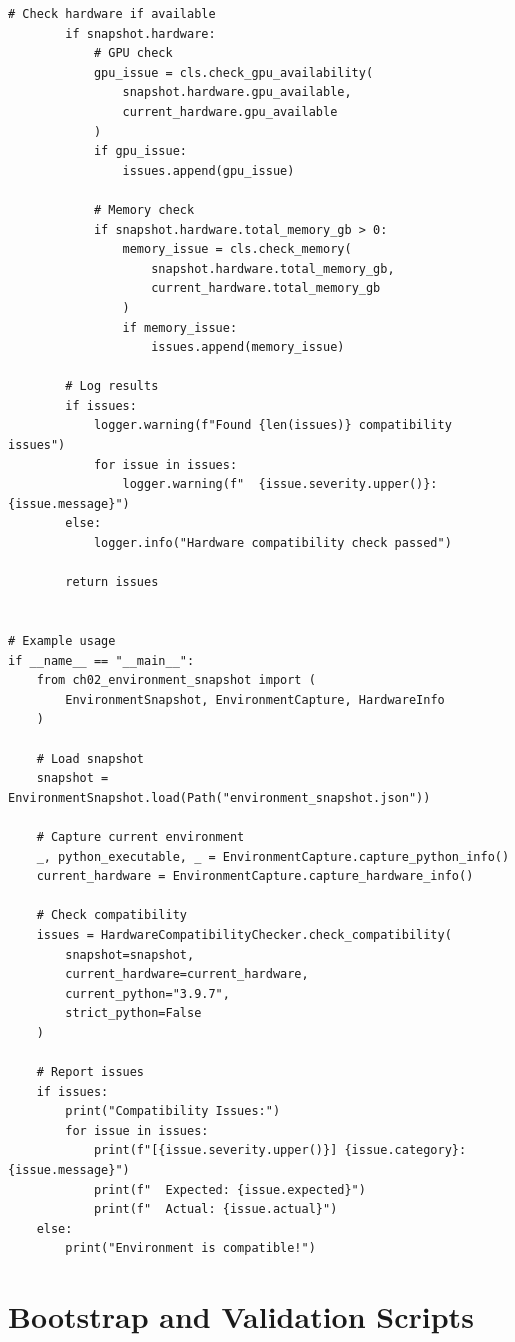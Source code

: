 \begin{lstlisting}[style=python, caption={Hardware compatibility checking}]
        # Check hardware if available
        if snapshot.hardware:
            # GPU check
            gpu_issue = cls.check_gpu_availability(
                snapshot.hardware.gpu_available,
                current_hardware.gpu_available
            )
            if gpu_issue:
                issues.append(gpu_issue)

            # Memory check
            if snapshot.hardware.total_memory_gb > 0:
                memory_issue = cls.check_memory(
                    snapshot.hardware.total_memory_gb,
                    current_hardware.total_memory_gb
                )
                if memory_issue:
                    issues.append(memory_issue)

        # Log results
        if issues:
            logger.warning(f"Found {len(issues)} compatibility issues")
            for issue in issues:
                logger.warning(f"  {issue.severity.upper()}: {issue.message}")
        else:
            logger.info("Hardware compatibility check passed")

        return issues


# Example usage
if __name__ == "__main__":
    from ch02_environment_snapshot import (
        EnvironmentSnapshot, EnvironmentCapture, HardwareInfo
    )

    # Load snapshot
    snapshot = EnvironmentSnapshot.load(Path("environment_snapshot.json"))

    # Capture current environment
    _, python_executable, _ = EnvironmentCapture.capture_python_info()
    current_hardware = EnvironmentCapture.capture_hardware_info()

    # Check compatibility
    issues = HardwareCompatibilityChecker.check_compatibility(
        snapshot=snapshot,
        current_hardware=current_hardware,
        current_python="3.9.7",
        strict_python=False
    )

    # Report issues
    if issues:
        print("Compatibility Issues:")
        for issue in issues:
            print(f"[{issue.severity.upper()}] {issue.category}: {issue.message}")
            print(f"  Expected: {issue.expected}")
            print(f"  Actual: {issue.actual}")
    else:
        print("Environment is compatible!")
\end{lstlisting}

\section{Bootstrap and Validation Scripts}


